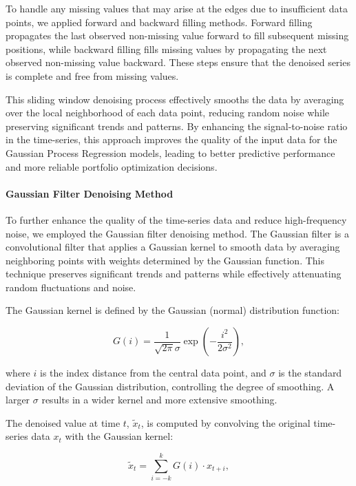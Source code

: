 To handle any missing values that may arise at the edges due to insufficient data points, we applied forward and backward filling methods. Forward filling propagates the last observed non-missing value forward to fill subsequent missing positions, while backward filling fills missing values by propagating the next observed non-missing value backward. These steps ensure that the denoised series is complete and free from missing values.

This sliding window denoising process effectively smooths the data by averaging over the local neighborhood of each data point, reducing random noise while preserving significant trends and patterns. By enhancing the signal-to-noise ratio in the time-series, this approach improves the quality of the input data for the Gaussian Process Regression models, leading to better predictive performance and more reliable portfolio optimization decisions.

\paragraph{Gaussian Filter Denoising Method}

To further enhance the quality of the time-series data and reduce high-frequency noise, we employed the Gaussian filter denoising method. The Gaussian filter is a convolutional filter that applies a Gaussian kernel to smooth data by averaging neighboring points with weights determined by the Gaussian function. This technique preserves significant trends and patterns while effectively attenuating random fluctuations and noise.

The Gaussian kernel is defined by the Gaussian (normal) distribution function:

\begin{equation}
G(i) = \frac{1}{\sqrt{2\pi} \sigma} \exp\left( -\frac{i^2}{2\sigma^2} \right),
\end{equation}

where $i$ is the index distance from the central data point, and $\sigma$ is the standard deviation of the Gaussian distribution, controlling the degree of smoothing. A larger $\sigma$ results in a wider kernel and more extensive smoothing.

The denoised value at time $t$, $\tilde{x}_t$, is computed by convolving the original time-series data $x_t$ with the Gaussian kernel:

\begin{equation}
\tilde{x}_t = \sum_{i = -k}^{k} G(i) \cdot x_{t + i},
\end{equation}

